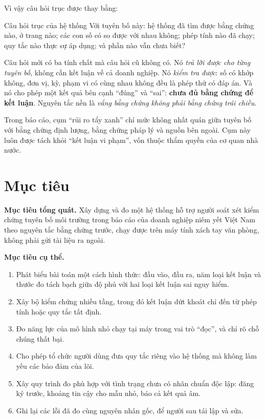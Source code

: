 Vì vậy câu hỏi trục được thay bằng:

\begin{hopy}{Câu hỏi trục của hệ thống}
Với tuyên bố này: hệ thống đã tìm được bằng chứng nào, ở trang nào; các con số có so được với nhau không; phép tính nào đã chạy; quy tắc nào thực sự áp dụng; và phần nào vẫn chưa biết?
\end{hopy}

Câu hỏi mới có ba tính chất mà câu hỏi cũ không có. Nó \emph{trả lời được cho từng tuyên bố}, không cần kết luận về cả doanh nghiệp. Nó \emph{kiểm tra được}: số có khớp không, đơn vị, kỳ, phạm vi có cùng nhau không đều là phép thử có đáp án. Và nó cho phép một kết quả bên cạnh “đúng” và “sai”: \textbf{chưa đủ bằng chứng để kết luận}. Nguyên tắc nền là \emph{vắng bằng chứng không phải bằng chứng trái chiều}.

Trong báo cáo, cụm “rủi ro tẩy xanh” chỉ mức không nhất quán giữa tuyên bố với bằng chứng định lượng, bằng chứng pháp lý và nguồn bên ngoài. Cụm này luôn được tách khỏi “kết luận vi phạm”, vốn thuộc thẩm quyền của cơ quan nhà nước.

\section{Mục tiêu}

\textbf{Mục tiêu tổng quát.} Xây dựng và đo một hệ thống hỗ trợ người soát xét kiểm chứng tuyên bố môi trường trong báo cáo của doanh nghiệp niêm yết Việt Nam theo nguyên tắc bằng chứng trước, chạy được trên máy tính xách tay văn phòng, không phải gửi tài liệu ra ngoài.

\textbf{Mục tiêu cụ thể.}
\begin{enumerate}
\item Phát biểu bài toán một cách hình thức: đầu vào, đầu ra, năm loại kết luận và thước đo tách bạch giữa độ phủ với hai loại kết luận sai nguy hiểm.
\item Xây bộ kiểm chứng nhiều tầng, trong đó kết luận dứt khoát chỉ đến từ phép tính hoặc quy tắc tất định.
\item Đo năng lực của mô hình nhỏ chạy tại máy trong vai trò “đọc”, và chỉ rõ chỗ chúng thất bại.
\item Cho phép tổ chức người dùng đưa quy tắc riêng vào hệ thống mà không làm yếu các bảo đảm của lõi.
\item Xây quy trình đo phù hợp với tình trạng chưa có nhãn chuẩn độc lập: đăng ký trước, khoảng tin cậy cho mẫu nhỏ, báo cả kết quả âm.
\item Ghi lại các lỗi đã đo cùng nguyên nhân gốc, để người sau tái lập và sửa.
\end{enumerate}


